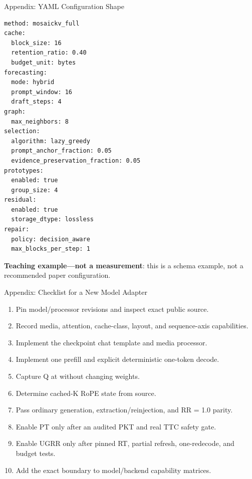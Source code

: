 \documentclass[aspectratio=169,10pt]{beamer}
\newcommand{\code}[1]{\texttt{\detokenize{#1}}}
\newcommand{\teachinglabel}{\textcolor{mkPurple}{\textbf{Teaching example---not a measurement}}}
\newcommand{\tightitems}{\setlength{\itemsep}{0.28em}\setlength{\parskip}{0pt}}
\begin{document}
\begin{frame}[fragile]{Appendix: YAML Configuration Shape}
\scriptsize
\begin{lstlisting}[style=mosaickv,language={},basicstyle=\tiny\ttfamily]
method: mosaickv_full
cache:
  block_size: 16
  retention_ratio: 0.40
  budget_unit: bytes
forecasting:
  mode: hybrid
  prompt_window: 16
  draft_steps: 4
graph:
  max_neighbors: 8
selection:
  algorithm: lazy_greedy
  prompt_anchor_fraction: 0.05
  evidence_preservation_fraction: 0.05
prototypes:
  enabled: true
  group_size: 4
residual:
  enabled: true
  storage_dtype: lossless
repair:
  policy: decision_aware
  max_blocks_per_step: 1
\end{lstlisting}
\teachinglabel: this is a schema example, not a recommended paper configuration.
\end{frame}

\begin{frame}{Appendix: Checklist for a New Model Adapter}
\scriptsize
\begin{enumerate}\tightitems
  \item Pin model/processor revisions and inspect exact public source.
  \item Record media, attention, cache-class, layout, and sequence-axis capabilities.
  \item Implement the checkpoint chat template and media processor.
  \item Implement one prefill and explicit deterministic one-token decode.
  \item Capture Q at \code{q_proj} without changing weights.
  \item Determine cached-K RoPE state from source.
  \item Pass ordinary generation, extraction/reinjection, and RR = 1.0 parity.
  \item Enable PT only after an audited PKT and real TTC safety gate.
  \item Enable UGRR only after pinned RT, partial refresh, one-redecode, and budget tests.
  \item Add the exact boundary to model/backend capability matrices.
\end{enumerate}
\end{frame}
\end{document}
